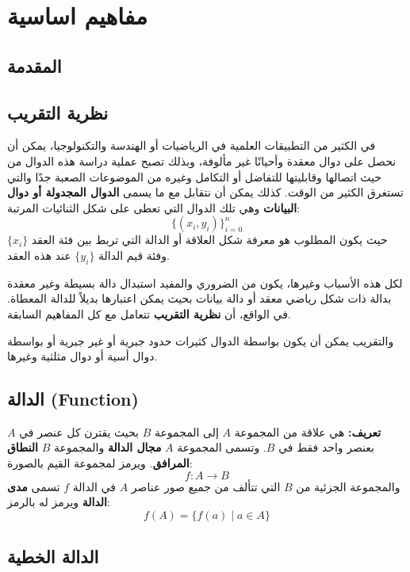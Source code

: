 \chapter{مفاهيم اساسية}
	
	\section*{المقدمة}
	
	\section{نظرية التقريب }
	
	في الكثير من التطبيقات العلمية في الرياضيات أو الهندسة والتكنولوجيا، يمكن أن نحصل على دوال معقدة وأحيانًا غير مألوفة، وبذلك تصبح عملية دراسة هذه الدوال من حيث اتصالها وقابليتها للتفاضل أو التكامل وغيره من الموضوعات الصعبة جدًا والتي تستغرق الكثير من الوقت.  
	كذلك يمكن أن نتقابل مع ما يسمى \textbf{الدوال المجدولة أو دوال البيانات} وهي تلك الدوال التي تعطى على شكل الثنائيات المرتبة:
	\[
	\{ (x_i, y_i) \}_{i=0}^{n}
	\]
	حيث يكون المطلوب هو معرفة شكل العلاقة أو الدالة التي تربط بين فئة العقد \(\{x_i\}\) وفئة قيم الدالة \(\{y_i\}\) عند هذه العقد.
	
	لكل هذه الأسباب وغيرها، يكون من الضروري والمفيد استبدال دالة بسيطة وغير معقدة بدالة ذات شكل رياضي معقد أو دالة بيانات بحيث يمكن اعتبارها بديلاً للدالة المعطاة. في الواقع، أن \textbf{نظرية التقريب} تتعامل مع كل المفاهيم السابقة.  
	
	والتقريب يمكن أن يكون بواسطة الدوال كثيرات حدود جبرية أو غير جبرية أو بواسطة دوال أسية أو دوال مثلثية وغيرها.
	
	\section{الدالة (Function)}
	
	\textbf{تعريف:}  
	هي علاقة من المجموعة \( A \) إلى المجموعة \( B \) بحيث يقترن كل عنصر في \( A \) بعنصر واحد فقط في \( B \). وتسمى المجموعة \( A \) \textbf{مجال الدالة} والمجموعة \( B \) \textbf{النطاق المرافق}. ويرمز لمجموعة القيم بالصورة:
	\[
	f: A \to B
	\]
	والمجموعة الجزئية من \( B \) التي تتألف من جميع صور عناصر \( A \) في الدالة \( f \) تسمى \textbf{مدى الدالة} ويرمز له بالرمز:
	\[
	f(A) = \{ f(a) \mid a \in A \}
	\]
	
	\section{الدالة الخطية }
	
